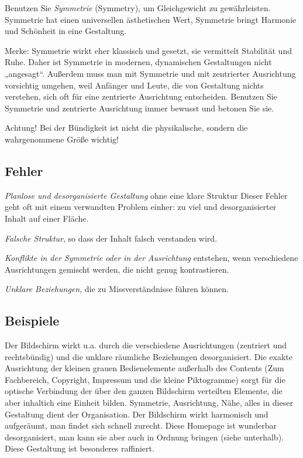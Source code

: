 Benutzen Sie \emph{Symmetrie} (Symmetry), um Gleichgewicht zu gewährleisten. Symmetrie hat einen universellen ästhetischen Wert, Symmetrie bringt Harmonie und Schönheit in eine Gestaltung.

Merke: Symmetrie wirkt eher klassisch und gesetzt, sie vermittelt Stabilität und Ruhe. Daher ist Symmetrie in modernen, dynamischen Gestaltungen nicht „angesagt“. Außerdem muss man mit Symmetrie und mit zentrierter Ausrichtung vorsichtig umgehen, weil Anfänger und Leute, die von Gestaltung nichts verstehen, sich oft für eine zentrierte Ausrichtung entscheiden. Benutzen Sie Symmetrie und zentrierte Ausrichtung immer bewusst und betonen Sie sie.

Achtung! Bei der Bündigkeit ist nicht die physikalische, sondern die wahrgenommene Größe wichtig!

\subsection{Fehler}
\emph{Planlose und desorganisierte Gestaltung} ohne eine klare Struktur Dieser Fehler geht oft mit einem verwandten Problem einher: zu viel und desorganisierter Inhalt auf einer Fläche.

\emph{Falsche Struktur}, so dass der Inhalt falsch verstanden wird.

\emph{Konflikte in der Symmetrie oder in der Ausrichtung} entstehen, wenn verschiedene Ausrichtungen gemischt werden, die nicht genug kontrastieren.

\emph{Unklare Beziehungen}, die zu Missverständnisse führen können.

\subsection{Beispiele}
Der Bildschirm wirkt u.a. durch die verschiedene Ausrichtungen (zentriert und rechtsbündig) und die unklare räumliche Beziehungen desorganisiert. 
Die exakte Ausrichtung der kleinen grauen Bedienelemente außerhalb des Contents (Zum Fachbereich, Copyright, Impressum und die kleine Piktogramme) sorgt für die optische Verbindung der über den ganzen Bildschirm verteilten Elemente, die aber inhaltich eine Einheit bilden.
Symmetrie, Ausrichtung, Nähe, alles in dieser Gestaltung dient der Organisation. Der Bildschirm wirkt harmonisch und aufgeräumt, man findet sich schnell zurecht.
Diese Homepage ist wunderbar desorganisiert, man kann sie aber auch in Ordnung bringen (siehe unterhalb). Diese Gestaltung ist besonderes raffiniert.

